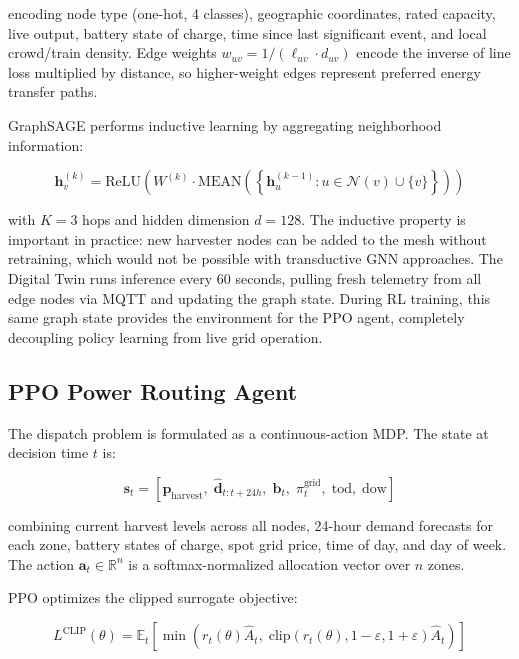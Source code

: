 \documentclass[conference]{IEEEtran}
\begin{document}
encoding node type (one-hot, 4 classes), geographic coordinates, rated capacity, live output, battery state of charge, time since last significant event, and local crowd/train density. Edge weights $w_{uv} = 1/(\ell_{uv} \cdot d_{uv})$ encode the inverse of line loss multiplied by distance, so higher-weight edges represent preferred energy transfer paths.

GraphSAGE performs inductive learning by aggregating neighborhood information:

\begin{equation}
\mathbf{h}_v^{(k)} = \text{ReLU}\!\left(W^{(k)} \cdot \text{MEAN}\!\left(\left\{\mathbf{h}_u^{(k-1)} : u \in \mathcal{N}(v) \cup \{v\}\right\}\right)\right)
\label{eq:graphsage}
\end{equation}

with $K{=}3$ hops and hidden dimension $d{=}128$. The inductive property is important in practice: new harvester nodes can be added to the mesh without retraining, which would not be possible with transductive GNN approaches. The Digital Twin runs inference every 60 seconds, pulling fresh telemetry from all edge nodes via MQTT and updating the graph state. During RL training, this same graph state provides the environment for the PPO agent, completely decoupling policy learning from live grid operation.

\subsection{PPO Power Routing Agent}

The dispatch problem is formulated as a continuous-action MDP. The state at decision time $t$ is:

\begin{equation}
\mathbf{s}_t = \left[\mathbf{p}_{\text{harvest}}, \; \hat{\mathbf{d}}_{t:t+24h}, \; \mathbf{b}_t, \; \pi_t^{\text{grid}}, \; \text{tod}, \; \text{dow}\right]
\label{eq:state}
\end{equation}

combining current harvest levels across all nodes, 24-hour demand forecasts for each zone, battery states of charge, spot grid price, time of day, and day of week. The action $\mathbf{a}_t \in \mathbb{R}^n$ is a softmax-normalized allocation vector over $n$ zones.

PPO optimizes the clipped surrogate objective:

\begin{equation}
L^{\text{CLIP}}(\theta) = \mathbb{E}_t\!\left[\min\!\left(r_t(\theta)\hat{A}_t, \; \text{clip}\!\left(r_t(\theta), 1-\varepsilon, 1+\varepsilon\right)\hat{A}_t\right)\right]
\label{eq:ppo}
\end{equation}
\end{document}
